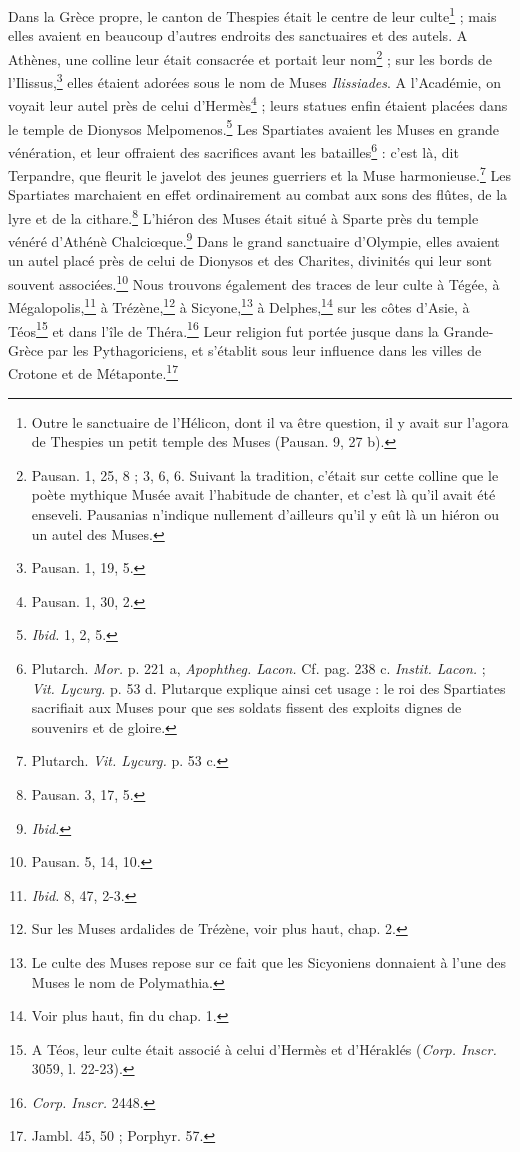 \documentclass[landscape, a4paper, 11pt, oneside, polutonikogreek, french]{article}
\begin{document}
Dans la Grèce propre, le canton de Thespies était le centre de leur culte\footnote{Outre le sanctuaire de l'Hélicon, dont il va être question, il y avait sur l'agora de Thespies un petit temple des Muses (Pausan. 9, 27 b).} ; mais elles avaient en beaucoup d'autres endroits des sanctuaires et des autels. A Athènes, une colline leur était consacrée et portait leur nom\footnote{Pausan. 1, 25, 8 ; 3, 6, 6. Suivant la tradition, c'était sur cette colline que le poète mythique Musée avait l'habitude de chanter, et c'est là qu'il avait été enseveli. Pausanias n'indique nullement d'ailleurs qu'il y eût là un hiéron ou un autel des Muses.} ; sur les bords de l'Ilissus,\footnote{Pausan. 1, 19, 5.} elles étaient adorées sous le nom de Muses \emph{Ilissiades}. A l'Académie, on voyait leur autel près de celui d'Hermès\footnote{Pausan. 1, 30, 2.} ; leurs statues enfin étaient placées dans le temple de Dionysos Melpomenos.\footnote{\emph{Ibid.} 1, 2, 5.} Les Spartiates avaient les Muses en grande vénération, et leur offraient des sacrifices avant les batailles\footnote{Plutarch. \emph{Mor.} p. 221 a, \emph{Apophtheg. Lacon.} Cf. pag. 238 c. \emph{Instit. Lacon.} ; \emph{Vit. Lycurg.} p. 53 d. Plutarque explique ainsi cet usage : le roi des Spartiates sacrifiait aux Muses pour que ses soldats fissent des exploits dignes de souvenirs et de gloire.} : c'est là, dit Terpandre, que fleurit le javelot des jeunes guerriers et la Muse harmonieuse.\footnote{Plutarch. \emph{Vit. Lycurg.} p. 53 c.} Les Spartiates marchaient en effet ordinairement au combat aux sons des flûtes, de la lyre et de la cithare.\footnote{Pausan. 3, 17, 5.} L'hiéron des Muses était situé à Sparte près du temple vénéré d'Athénè Chalciœque.\footnote{\emph{Ibid.}} Dans le grand sanctuaire d'Olympie, elles avaient un autel placé près de celui de Dionysos et des Charites, divinités qui leur sont souvent associées.\footnote{Pausan. 5, 14, 10.} Nous trouvons également des traces de leur culte à Tégée, à Mégalopolis,\footnote{\emph{Ibid.} 8, 47, 2-3.} à Trézène,\footnote{Sur les Muses ardalides de Trézène, voir plus haut, chap. 2.} à Sicyone,\footnote{Le culte des Muses repose sur ce fait que les Sicyoniens donnaient à l'une des Muses le nom de Polymathia.} à Delphes,\footnote{Voir plus haut, fin du chap. 1.} sur les côtes d'Asie, à Téos\footnote{A Téos, leur culte était associé à celui d'Hermès et d'Héraklés (\emph{Corp. Inscr.} 3059, l. 22-23).} et dans l'île de Théra.\footnote{\emph{Corp. Inscr.} 2448.} Leur religion fut portée jusque dans la Grande-Grèce par les Pythagoriciens, et s'établit sous leur influence dans les villes de Crotone et de Métaponte.\footnote{Jambl. 45, 50 ; Porphyr. 57.}
\end{document}
